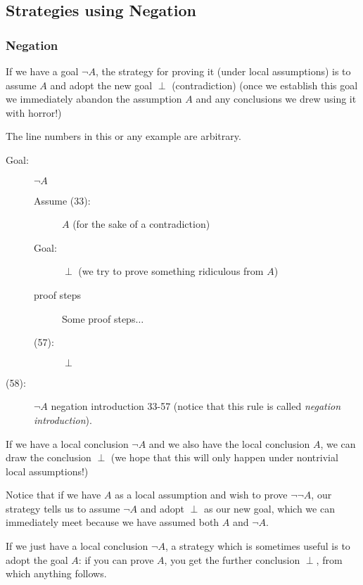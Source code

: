 \documentclass[12pt]{article}
\begin{document}
\subsection{Strategies using Negation}

\subsubsection{Negation}

If we have a goal $\neg A$, the strategy for proving it (under local
assumptions) is to assume $A$ and adopt the new goal $\perp$
(contradiction) (once we establish this goal we immediately abandon
the assumption $A$ and any conclusions we drew using it with horror!)

The line numbers in this or any example are arbitrary.

\begin{description}

\item[Goal:]  $\neg A$

\begin{description}

\item[Assume (33):]  $A$ (for the sake of a contradiction)

\item[Goal:]  $\perp$ (we try to prove something ridiculous from $A$)

\item[proof steps]  Some proof steps$\ldots$

\item[(57):] $\perp$

\end{description}

\item [(58):]  $\neg A$ negation introduction 33-57 (notice that this rule is called {\em negation introduction\/}).

\end{description}

If we have a local conclusion $\neg A$ and we also have the local
conclusion $A$, we can draw the conclusion $\perp$ (we hope that this
will only happen under nontrivial local assumptions!)

Notice that if we have $A$ as a local assumption and wish to prove
$\neg\neg A$, our strategy tells us to assume $\neg A$ and adopt
$\perp$ as our new goal, which we can immediately meet because we have
assumed both $A$ and $\neg A$.

If we just have a local conclusion $\neg A$, a strategy which is
sometimes useful is to adopt the goal $A$: if you can prove $A$, you
get the further conclusion $\perp$, from which anything follows.
\end{document}
